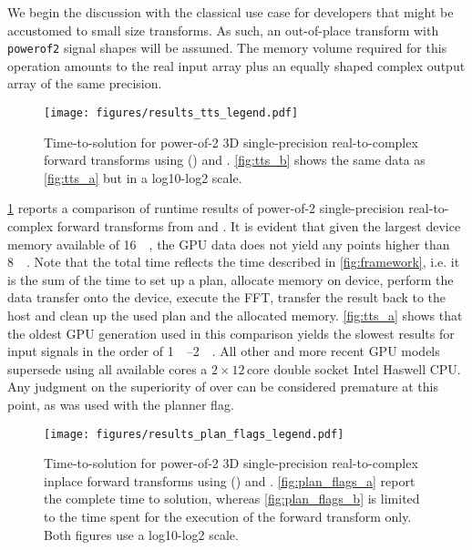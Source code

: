 We begin the discussion with the classical use case for developers that might be accustomed to small size transforms. As such, an out-of-place transform with \texttt{powerof2} signal shapes will be assumed. The memory volume required for this operation amounts to the real input array plus an equally shaped complex output array of the same precision.   

\begin{figure}[!htbp]
  \centering
  \texttt{[image: figures/results\_tts\_legend.pdf]}\vspace{-1em}
  \hfill
  \caption{Time-to-solution for power-of-2 3D single-precision real-to-complex forward transforms using \fftw{} () and \cufft{}. \cref{fig:tts_b} shows the same data as \cref{fig:tts_a} but in a log10-log2 scale.}
  \label{fig:tts}
\end{figure}

\cref{fig:tts} reports a comparison of runtime results of power-of-2 single-precision real-to-complex forward transforms from \fftw{} and \cufft{}. It is evident that given the largest device memory available of  \SI{16}{\gibi\byte}, the GPU data does not yield any points higher than \SI{8}{\gibi\byte}. Note that the total time reflects the time described in \cref{fig:framework}, i.e. it is the sum of the time to set up a plan, allocate memory on device, perform the data transfer onto the device, execute the FFT, transfer the result back to the host and clean up the used plan and the allocated memory. \cref{fig:tts_a} shows that the oldest GPU generation used in this comparison yields the slowest results for input signals in the order of \SIrange{1}{2}{\gibi\byte}. All other and more recent GPU models supersede \fftw{} using all available cores a $2\times12\,\text{core}$ double socket Intel Haswell CPU. Any judgment on the superiority of \cufft{} over \fftw{} can be considered premature at this point, as \fftw{} was used with the  planner flag.

\begin{figure}[!htbp]
  \centering
  \texttt{[image: figures/results\_plan\_flags\_legend.pdf]}\vspace{-1em}
  \hfill
  \caption{Time-to-solution for power-of-2 3D single-precision real-to-complex inplace forward transforms using \fftw{} () and \cufft{}. \cref{fig:plan_flags_a} report the complete time to solution, whereas \cref{fig:plan_flags_b} is limited to the time spent for the execution of the forward transform only. Both figures use a log10-log2 scale.}
  \label{fig:fftw_plan_flags}
\end{figure}

